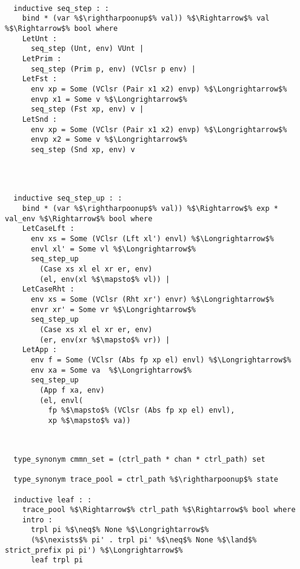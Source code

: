 \documentclass{article}
\begin{document}
\begin{lstlisting}[style=codestyle1, escapechar=\%]

  inductive seq_step : :
    bind * (var %$\rightharpoonup$% val)) %$\Rightarrow$% val %$\Rightarrow$% bool where
    LetUnt : 
      seq_step (Unt, env) VUnt |
    LetPrim :
      seq_step (Prim p, env) (VClsr p env) |
    LetFst :
      env xp = Some (VClsr (Pair x1 x2) envp) %$\Longrightarrow$%
      envp x1 = Some v %$\Longrightarrow$% 
      seq_step (Fst xp, env) v |
    LetSnd : 
      env xp = Some (VClsr (Pair x1 x2) envp) %$\Longrightarrow$%  
      envp x2 = Some v %$\Longrightarrow$% 
      seq_step (Snd xp, env) v


  \end{lstlisting}
\begin{lstlisting}[style=codestyle1, escapechar=\%]


  inductive seq_step_up : :
    bind * (var %$\rightharpoonup$% val)) %$\Rightarrow$% exp * val_env %$\Rightarrow$% bool where 
    LetCaseLft :
      env xs = Some (VClsr (Lft xl') envl) %$\Longrightarrow$%
      envl xl' = Some vl %$\Longrightarrow$%
      seq_step_up
        (Case xs xl el xr er, env)
        (el, env(xl %$\mapsto$% vl)) |
    LetCaseRht : 
      env xs = Some (VClsr (Rht xr') envr) %$\Longrightarrow$% 
      envr xr' = Some vr %$\Longrightarrow$%
      seq_step_up
        (Case xs xl el xr er, env)
        (er, env(xr %$\mapsto$% vr)) |
    LetApp :
      env f = Some (VClsr (Abs fp xp el) envl) %$\Longrightarrow$% 
      env xa = Some va  %$\Longrightarrow$% 
      seq_step_up
        (App f xa, env)
        (el, envl(
          fp %$\mapsto$% (VClsr (Abs fp xp el) envl),
          xp %$\mapsto$% va))

  \end{lstlisting}
\begin{lstlisting}[style=codestyle1, escapechar=\%]


  type_synonym cmmn_set = (ctrl_path * chan * ctrl_path) set

  type_synonym trace_pool = ctrl_path %$\rightharpoonup$% state

  inductive leaf : :
    trace_pool %$\Rightarrow$% ctrl_path %$\Rightarrow$% bool where
    intro :
      trpl pi %$\neq$% None %$\Longrightarrow$% 
      (%$\nexists$% pi' . trpl pi' %$\neq$% None %$\land$% strict_prefix pi pi') %$\Longrightarrow$%  
      leaf trpl pi

  \end{lstlisting}
\end{document}

